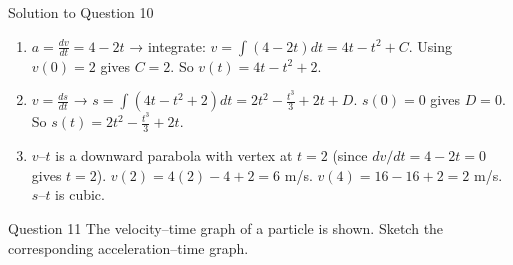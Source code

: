 \documentclass{beamer}
\begin{document}
\begin{frame}[shrink=15]{Solution to Question 10}
\begin{enumerate}
    \item $a = \frac{dv}{dt} = 4 - 2t$ → integrate: $v = \int (4-2t) dt = 4t - t^2 + C$. Using $v(0)=2$ gives $C=2$. So $v(t) = 4t - t^2 + 2$.
    \item $v = \frac{ds}{dt}$ → $s = \int (4t - t^2 + 2) dt = 2t^2 - \frac{t^3}{3} + 2t + D$. $s(0)=0$ gives $D=0$. So $s(t) = 2t^2 - \frac{t^3}{3} + 2t$.
    \item $v$–$t$ is a downward parabola with vertex at $t=2$ (since $dv/dt = 4-2t=0$ gives $t=2$). $v(2)=4(2)-4+2=6$ m/s. $v(4)=16-16+2=2$ m/s. $s$–$t$ is cubic.
\end{enumerate}
\begin{center}
\qquad
{}
\end{center}
\end{frame}

\begin{frame}[shrink=15]{Question 11}
The velocity–time graph of a particle is shown. Sketch the corresponding acceleration–time graph.
\begin{center}
\end{center}
\end{frame}
\end{document}
